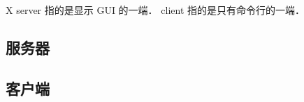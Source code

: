 
\begin{issues}
\issueDraft
\end{issues}

X server 指的是显示 GUI 的一端． client 指的是只有命令行的一端．

\subsection{服务器}

\subsection{客户端}